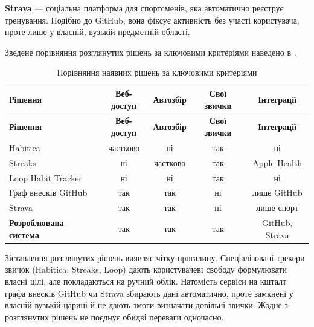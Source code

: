 \textbf{Strava} — соціальна платформа для спортсменів, яка автоматично реєструє тренування. Подібно до GitHub, вона фіксує активність без участі користувача, проте лише у власній, вузькій предметній області.

Зведене порівняння розглянутих рішень за ключовими критеріями наведено в .

\needspace{6cm}
\begin{spacing}{1.2}
    \footnotesize
    \noindent
    \begin{xltabular}{\textwidth}{| >{\raggedright\arraybackslash}X | c | c | c | c |}
        \caption{Порівняння наявних рішень за ключовими критеріями} \label{tab:analogs} \\
        \hline
        \textbf{Рішення} & \textbf{Веб-доступ} & \textbf{Автозбір} & \textbf{Свої звички} & \textbf{Інтеграції} \\ \hline
        \endfirsthead

        \hline
        \textbf{Рішення} & \textbf{Веб-доступ} & \textbf{Автозбір} & \textbf{Свої звички} & \textbf{Інтеграції} \\ \hline
        \endhead

        Habitica & частково & ні & так & ні \\ \hline
        Streaks & ні & частково & так & Apple Health \\ \hline
        Loop Habit Tracker & ні & ні & так & ні \\ \hline
        Граф внесків GitHub & так & так & ні & лише GitHub \\ \hline
        Strava & так & так & ні & лише спорт \\ \hline
        \textbf{Розроблювана система} & так & так & так & GitHub, Strava \\ \hline
    \end{xltabular}
\end{spacing}


Зіставлення розглянутих рішень виявляє чітку прогалину. Спеціалізовані трекери звичок (Habitica, Streaks, Loop) дають користувачеві свободу формулювати власні цілі, але покладаються на ручний облік. Натомість сервіси на кшталт графа внесків GitHub чи Strava збирають дані автоматично, проте замкнені у власній вузькій царині й не дають змоги визначати довільні звички. Жодне з розглянутих рішень не поєднує обидві переваги одночасно.

